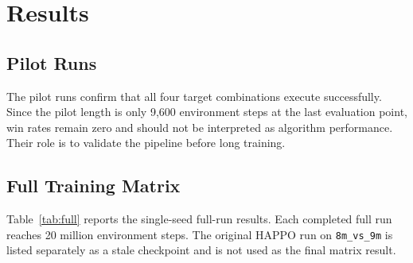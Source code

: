 \documentclass{article}
\begin{document}
\section{Results}

\subsection{Pilot Runs}

The pilot runs confirm that all four target combinations execute successfully. Since the pilot length is only 9,600 environment steps at the last evaluation point, win rates remain zero and should not be interpreted as algorithm performance. Their role is to validate the pipeline before long training.

\begin{table}[h]
\centering
\caption{Last evaluation of the 10,000-step pilot runs.}
\label{tab:pilot}
\end{table}

\subsection{Full Training Matrix}

Table~\ref{tab:full} reports the single-seed full-run results. Each completed full run reaches 20 million environment steps. The original HAPPO run on \texttt{8m\_vs\_9m} is listed separately as a stale checkpoint and is not used as the final matrix result.

\begin{table}[h]
\centering
\caption{Full-run results. HAPPO original is a stale checkpoint.}
\label{tab:full}
\end{table}
\end{document}
